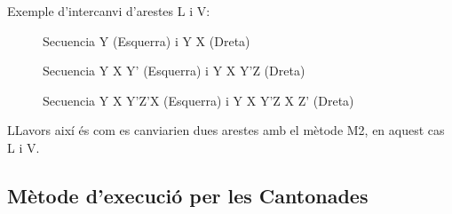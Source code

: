 Exemple d'intercanvi d'arestes L i V:

\begin{figure}[htbp]
    \centering
    \begin{subfigure}
        \centering\RubikCubeSolvedWY
    \end{subfigure}
    \begin{subfigure}
        \centering\RubikCubeSolvedWY
    \end{subfigure}
    \caption{Secuencia Y (Esquerra) i Y X (Dreta)}
\end{figure}

\begin{figure}[htbp]
    \centering
    \begin{subfigure}
        \centering\RubikCubeSolvedWY
    \end{subfigure}
    \begin{subfigure}
        \centering\RubikCubeSolvedWY
    \end{subfigure}
    \caption{Secuencia Y X Y' (Esquerra) i Y X Y'Z (Dreta)}
\end{figure}

\begin{figure}[h!]
    \centering
    \begin{subfigure}
        \centering\RubikCubeSolvedWY
    \end{subfigure}
    \begin{subfigure}
        \centering\RubikCubeSolvedWY
    \end{subfigure}
    \caption{Secuencia Y X Y'Z'X (Esquerra) i Y X Y'Z X Z' (Dreta)}
\end{figure}

LLavors així és com es canviarien dues arestes amb el mètode M2, en aquest cas L i V.

\subsection{Mètode d'execució per les Cantonades}

